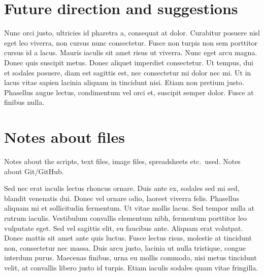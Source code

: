 \documentclass[parskip=full]{scrreprt}
\begin{document}
\section{Future direction and suggestions}
\label{sec:future}

Nunc orci justo, ultricies id pharetra a, consequat at dolor. Curabitur posuere nisl eget leo viverra, non cursus nunc consectetur. Fusce non turpis non sem porttitor cursus id a lacus. Mauris iaculis sit amet risus ut viverra. Nunc eget arcu magna. Donec quis suscipit metus. Donec aliquet imperdiet consectetur. Ut tempus, dui et sodales posuere, diam est sagittis est, nec consectetur mi dolor nec mi. Ut in lacus vitae sapien lacinia aliquam in tincidunt nisi. Etiam non pretium justo. Phasellus augue lectus, condimentum vel orci et, suscipit semper dolor. Fusce at finibus nulla.

\section{Notes about files}
\label{sec:files}

Notes about the scripts, text files, image files, spreadsheets etc.\ used. Notes about Git/GitHub.

Sed nec erat iaculis lectus rhoncus ornare. Duis ante ex, sodales sed mi sed, blandit venenatis dui. Donec vel ornare odio, laoreet viverra felis. Phasellus aliquam mi et sollicitudin fermentum. Ut vitae mollis lacus. Sed tempor nulla at rutrum iaculis. Vestibulum convallis elementum nibh, fermentum porttitor leo vulputate eget. Sed vel sagittis elit, eu faucibus ante. Aliquam erat volutpat. Donec mattis sit amet ante quis luctus. Fusce lectus risus, molestie at tincidunt non, consectetur nec massa. Duis arcu justo, lacinia ut nulla tristique, congue interdum purus. Maecenas finibus, urna eu mollis commodo, nisi metus tincidunt velit, at convallis libero justo id turpis. Etiam iaculis sodales quam vitae fringilla. 

\nocite{*}
\printbibliography
\end{document}
